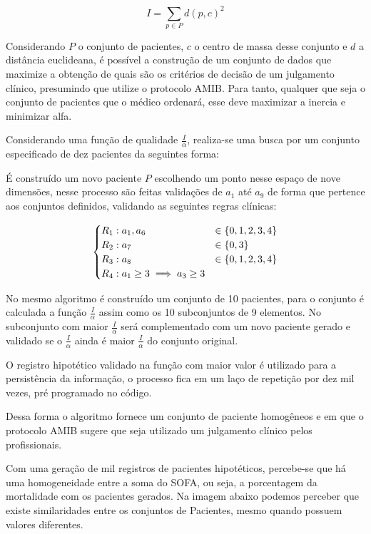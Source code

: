 \documentclass[12pt]{article}
\begin{document}
\[
I = \sum_{p \in P}d(p, c)^2
\] 

Considerando $P$ o conjunto de pacientes, $c$ o centro de massa desse conjunto e $d$ a distância euclideana, é possível a construção de um conjunto de dados que maximize a obtenção de quais são os critérios de decisão de um julgamento clínico, presumindo que utilize o protocolo AMIB. Para tanto, qualquer que seja o conjunto de pacientes que o médico ordenará, esse deve maximizar a inercia e minimizar alfa.

Considerando uma função de qualidade $\frac{I}{\alpha}$, realiza-se uma busca por um conjunto especificado de dez pacientes da seguintes forma:

É construído um novo paciente $P$ escolhendo um ponto nesse espaço de nove dimensões, nesse processo são feitas validações de $a_1$ até $a_9$ de forma que pertence aos conjuntos definidos, validando as seguintes regras clínicas:

\[
\begin{split}
    \begin{cases}
    R_1: a_1 , a_6 &\in \{0, 1, 2, 3, 4\} \\
    R_2: a_7 &\in \{0, 3\} \\
    R_3: a_8 &\in \{0, 1, 2, 3, 4\} \\
    R_4: a_1 \ge 3 \implies a_3 \ge 3 \\
    \end{cases}
\end{split}
\]

No mesmo algoritmo é construído um conjunto de 10 pacientes, para o conjunto é calculada a função $\frac{I}{\alpha}$ assim como os 10 subconjuntos de 9 elementos.
No subconjunto com maior $\frac{I}{\alpha}$ será complementado com um novo paciente gerado e validado se o $\frac{I}{\alpha}$ ainda é maior $\frac{I}{\alpha}$ do conjunto original.

O registro hipotético validado na função com maior valor é utilizado para a persistência da informação, o processo fica em um laço de repetição por dez mil vezes, pré programado no código.

Dessa forma o algoritmo fornece um conjunto de paciente homogêneos e em que o protocolo AMIB sugere que seja utilizado um julgamento clínico pelos profissionais.


Com uma geração de mil registros de pacientes hipotéticos, percebe-se que há uma homogeneidade entre a soma do SOFA, ou seja, a porcentagem da mortalidade com os pacientes gerados. Na imagem abaixo podemos perceber que existe similaridades entre os conjuntos de Pacientes, mesmo quando possuem valores diferentes.
\end{document}
